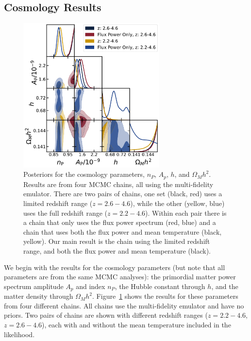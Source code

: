 \documentclass[a4paper,11pt]{article}
\begin{document}

\subsection{Cosmology Results}\label{sec:cosmo}

\begin{figure}
    \centering
    \includegraphics[width=0.66\textwidth]{figures/cosmo_corner.pdf}
    \caption{\label{fig:cosmo_corner}
    Posteriors for the cosmology parameters, $n_P$, $A_p$, $h$, and $\Omega_M h^2$.
    Results are from four MCMC chains, all using the multi-fidelity emulator.
    There are two pairs of chains, one set (black, red) uses a limited redshift range ($z=2.6-4.6$), while the other (yellow, blue) uses the full redshift range ($z=2.2-4.6$).
    Within each pair there is a chain that only uses the flux power spectrum (red, blue) and a chain that uses both the flux power and mean temperature (black, yellow).
    Our main result is the chain using the limited redshift range, and both the flux power and mean temperature (black).
    }
\end{figure}

We begin with the results for the cosmology parameters (but note that all parameters are from the same MCMC analyses): the primordial matter power spectrum amplitude $A_p$ and index $n_P$, the Hubble constant through $h$, and the matter density through $\Omega_M h^2$.
Figure~\ref{fig:cosmo_corner} shows the results for these parameters from four different chains.
All chains use the multi-fidelity emulator and have no priors.
Two pairs of chains are shown with different redshift ranges ($z=2.2-4.6$, $z=2.6-4.6$), each with and without the mean temperature included in the likelihood.
\end{document}
